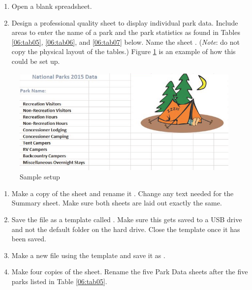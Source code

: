 \begin{enumerate}
	\item Open a blank spreadsheet.
	\item Design a professional quality sheet to display individual park data. Include areas to enter the name of a park and the park statistics as found in Tables \ref{06:tab05}, \ref{06:tab06}, and \ref{06:tab07} below. Name the sheet . (\textit{Note}: do not copy the physical layout of the tables.) Figure \ref{06:fig17} is an example of how this could be set up.
\end{enumerate}

\begin{figure}[H]
	\centering
	\includegraphics[width=\maxwidth{.95\linewidth}]{gfx/ch06_fig17}
	\caption{Sample setup}
	\label{06:fig17}
\end{figure}

\begin{enumerate}
	\item Make a copy of the  sheet and rename it . Change any text needed for the Summary sheet. Make sure both sheets are laid out exactly the same.
	\item Save the file as a template called . Make sure this gets saved to a USB drive and not the default folder on the hard drive. Close the template once it has been saved.
	\item Make a new file using the template and save it as .
	\item Make four copies of the  sheet. Rename the five Park Data sheets after the five parks listed in Table \ref{06:tab05}.
\end{enumerate}

